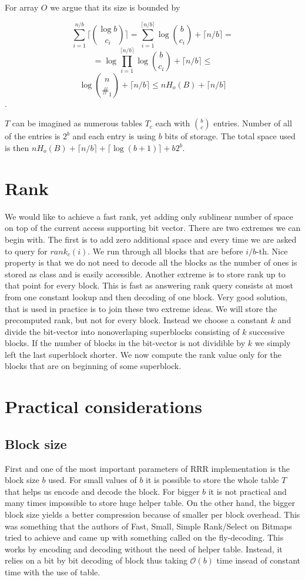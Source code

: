For array $O$ we argue that its size is bounded by

$$\sum_{i=1}^{n/b} \bigg\lceil{\log b\choose c_i}\bigg\rceil =
\sum_{i=1}^{\lceil n/b \rceil} \log {b\choose c_i} + \lceil n/b \rceil =$$
$$=\log\prod_{i=1}^{\lceil n/b \rceil} \log {b\choose c_i} + \lceil n/b \rceil \leq $$
$$\log{n\choose \#_1} +  \lceil n/b \rceil \leq nH_o(B) +  \lceil n/b \rceil$$.

$T$ can be imagined as numerous tables $T_c$ each with ${b\choose c}$ entries.
Number of  all of the entries is $2^b$ and each entry is using $b$ bits of storage.
The total space used is then $nH_o(B) +  \lceil n/b \rceil + \lceil \log(b+1) \rceil + b2^b$.

\section{Rank}

We would like to achieve a fast rank, yet adding only sublinear number of space on top of the
current access supporting bit vector. There are two extremes we can begin with. The first is to
add zero additional space and every time we are asked to query for $rank_c(i)$. We run through
all blocks that are before $i/b$-th. Nice property is that we do not need to decode all the blocks
as the number of ones is stored as class and is easily accessible.
Another extreme is to store rank up to that point for every block. This is fast as answering rank
query consists at most from one constant lookup and then decoding of one block.
Very good solution, that is used in practice is to join these two extreme ideas. We will store the
precomputed rank, but not for every block. Instead we choose a constant $k$ and divide
the bit-vector into nonoverlaping superblocks consisting of $k$ successive blocks. If the number of
blocks in the bit-vector is not dividible by $k$ we simply left the last superblock shorter.
We now compute the rank value only for the blocks that are on beginning of some superblock.

\section{Practical considerations}

\subsection{Block size}

First and one of the most important parameters of RRR implementation is the block
size $b$ used. For small values of $b$ it is possible to store the whole table
$T$ that helps us encode and decode the block. For bigger $b$ it is not practical
and many times impossible to store huge helper table. On the other hand, the bigger
block size yields a better compression because of smaller per block overhead. This was
something that the authors of Fast, Small, Simple Rank/Select on Bitmaps tried to
achieve and came up with something called on the fly-decoding. This works by encoding
and decoding without the need of helper table. Instead, it relies on a bit by bit decoding
of block thus taking $\mathcal{O}(b)$ time insead of constant time with the use of table.

